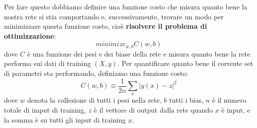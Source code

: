 Per fare questo dobbiamo definire una funzione costo che misura quanto bene la nostra rete si stia comportando e, successivamente, trovare un modo per minimizzare questa funzione costo, cioè \textbf{risolvere il problema di ottimizzazione}:
\begin{equation}
    minimize_{w,b}C(w,b)
\end{equation}
dove $C$ è una funzione dei pesi e dei biase della rete e misura quanto bene la rete performa sui dati di training $(X,y)$.
\newline
\newline
Per quantificare quanto bene il corrente set di parametri sta performando, definiamo una funzione costo:
\begin{equation}
    C(w,b)\equiv \frac{1}{2n}\sum_x \big| y(x)-z \big|^2
\end{equation}
dove $w$ denota la collezione di tutti i pesi nella rete, $b$ tutti i bias, $n$ è il numero totale di imput di training, $z$ è il vettore di output dalla rete quando $x$ è input, e la somma è su tutti gli input di training $x$.


